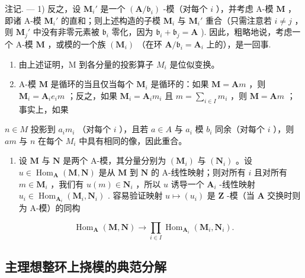 注记. --- 1) 反之，设 \(\mathbf{M}_i'\) 是一个 \((\mathbf{A} / \mathfrak{b}_i)\) -模（对每个 \(i\) ），并考虑 A-模 \(\mathbf{M}\) ，即诸 A-模 \(\mathbf{M}_i'\) 的直和；则上述构造的子模 \(\mathbf{M}_i\) 与 \(\mathbf{M}_i'\) 重合（只需注意若 \(i \neq j\) ，则 \(\mathbf{M}_j'\) 中没有非零元素被 \(\mathfrak{b}_i\) 零化，因为 \(\mathfrak{b}_i + \mathfrak{b}_j = \mathbf{A}\) ). 因此，粗略地说，考虑一个 A-模 \(\mathbf{M}\) ，或模的一个族 \((\mathbf{M}_i)\) （在环 \(\mathbf{A} / \mathfrak{b}_i = \mathbf{A}_i\) 上的），是一回事.

\begin{enumerate}
\def\labelenumi{\arabic{enumi})}
\setcounter{enumi}{1}
\item
  由上述证明，M 到各分量的投影算子 \(M_{i}\) 是位似变换。
\item
  A-模 \(\mathbf{M}\) 是循环的当且仅当每个 \(\mathbf{M}_i\) 是循环的：如果 \(\mathbf{M} = \mathbf{A}m\) ，则 \(\mathbf{M}_i = \mathbf{A}_i e_i m\) ；反之，如果 \(\mathbf{M}_i = \mathbf{A}_i m_i\) 且 \(m = \sum_{i \in I} m_i\) ，则 \(\mathbf{M} = \mathbf{A}m\) ；事实上，如果
\end{enumerate}

\(n \in M\) 投影到 \(a_i m_i\) （对每个 \(i\) ），且若 \(a \in A\) 与 \(a_i\) 模 \(b_i\) 同余（对每个 \(i\) ），则 \(am\) 与 \(n\) 在每个 \(M_i\) 中具有相同的像，因此重合。

\begin{enumerate}
\def\labelenumi{\arabic{enumi})}
\setcounter{enumi}{3}
\tightlist
\item
  设 \(\mathbf{M}\) 与 \(\mathbf{N}\) 是两个 A-模，其分量分别为 \((\mathbf{M}_i)\) 与 \((\mathbf{N}_i)\) 。设 \(u \in \operatorname{Hom}_{\mathbf{A}}(\mathbf{M}, \mathbf{N})\) 是从 \(\mathbf{M}\) 到 \(\mathbf{N}\) 的 A-线性映射；则对所有 \(i\) 且对所有 \(m \in \mathbf{M}_i\) ，我们有 \(u(m) \in \mathbf{N}_i\) ，所以 \(u\) 诱导一个 \(\mathbf{A}_i\) -线性映射 \(u_i \in \operatorname{Hom}_{\mathbf{A}_i}(\mathbf{M}_i, \mathbf{N}_i)\) . 容易验证映射 \(u \mapsto (u_i)\) 是 \(\mathbf{Z}\) -模（当 \(\mathbf{A}\) 交换时则为 A-模）的同构
\end{enumerate}

\[
\operatorname{Hom} _ {\mathbf {A}} (\mathbf {M}, \mathbf {N}) \rightarrow \prod_ {i \in I} \operatorname{Hom} _ {\mathbf {A} _ {i}} (\mathbf {M} _ {i}, \mathbf {N} _ {i}).
\]

\subsection{主理想整环上挠模的典范分解}

